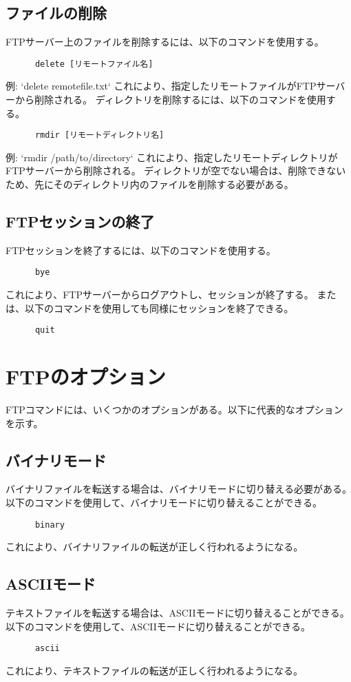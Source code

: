 \documentclass[a4paper,10pt]{jsarticle}
\begin{document}
    \subsection{ファイルの削除}
    FTPサーバー上のファイルを削除するには、以下のコマンドを使用する。
    \begin{lstlisting}
      delete [リモートファイル名]
    \end{lstlisting}
    例: `delete remotefile.txt`
    これにより、指定したリモートファイルがFTPサーバーから削除される。
    ディレクトリを削除するには、以下のコマンドを使用する。
    \begin{lstlisting}
      rmdir [リモートディレクトリ名]
    \end{lstlisting}
    例: `rmdir /path/to/directory`
    これにより、指定したリモートディレクトリがFTPサーバーから削除される。
    ディレクトリが空でない場合は、削除できないため、先にそのディレクトリ内のファイルを削除する必要がある。

    \subsection{FTPセッションの終了}
    FTPセッションを終了するには、以下のコマンドを使用する。
    \begin{lstlisting}
      bye
    \end{lstlisting}
    これにより、FTPサーバーからログアウトし、セッションが終了する。
    または、以下のコマンドを使用しても同様にセッションを終了できる。
    \begin{lstlisting}
      quit
    \end{lstlisting}

\section{FTPのオプション}
    FTPコマンドには、いくつかのオプションがある。以下に代表的なオプションを示す。

    \subsection{バイナリモード}
    バイナリファイルを転送する場合は、バイナリモードに切り替える必要がある。
    以下のコマンドを使用して、バイナリモードに切り替えることができる。
    \begin{lstlisting}
      binary
    \end{lstlisting}
    これにより、バイナリファイルの転送が正しく行われるようになる。

    \subsection{ASCIIモード}
    テキストファイルを転送する場合は、ASCIIモードに切り替えることができる。
    以下のコマンドを使用して、ASCIIモードに切り替えることができる。
    \begin{lstlisting}
      ascii
    \end{lstlisting}
    これにより、テキストファイルの転送が正しく行われるようになる。
\end{document}
